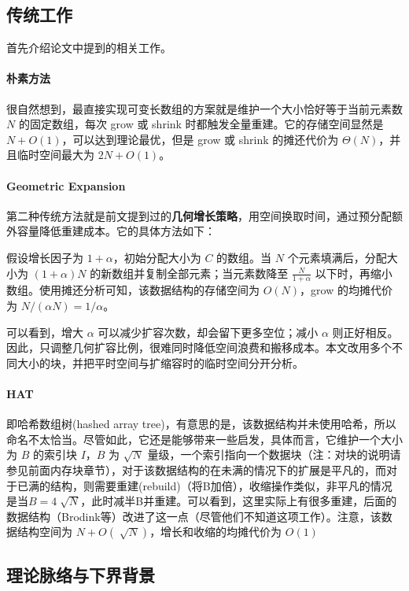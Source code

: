 \documentclass[12pt,a4paper]{article}
\begin{document}
\subsection{传统工作}

首先介绍论文中提到的相关工作。

\paragraph{朴素方法}

很自然想到，最直接实现可变长数组的方案就是维护一个大小恰好等于当前元素数 $N$ 的固定数组，每次 grow 或 shrink 时都触发全量重建。它的存储空间显然是 $N+O(1)$，可以达到理论最优，但是 grow 或 shrink 的摊还代价为 $\Theta(N)$，并且临时空间最大为 $2N+O(1)$。

\paragraph{Geometric Expansion} 第二种传统方法就是前文提到过的\textbf{几何增长策略}，用空间换取时间，通过预分配额外容量降低重建成本。它的具体方法如下：

假设增长因子为 $1+\alpha$，初始分配大小为 $C$ 的数组。当 $N$ 个元素填满后，分配大小为 $(1+\alpha)N$ 的新数组并复制全部元素；当元素数降至 $\frac{N}{1+\alpha}$ 以下时，再缩小数组。使用摊还分析可知，该数据结构的存储空间为 $O(N)$，grow 的均摊代价为 $N/(\alpha N)=1/\alpha$。

可以看到，增大 $\alpha$ 可以减少扩容次数，却会留下更多空位；减小 $\alpha$ 则正好相反。因此，只调整几何扩容比例，很难同时降低空间浪费和搬移成本。本文改用多个不同大小的块，并把平时空间与扩缩容时的临时空间分开分析。

\paragraph{HAT} 即哈希数组树(hashed array tree)\cite{sitarski1996hats}，有意思的是，该数据结构并未使用哈希，所以命名不太恰当。尽管如此，它还是能够带来一些启发，具体而言，它维护一个大小为 $B$ 的索引块 $I$，$B$ 为 $\sqrt{N}$ 量级，一个索引指向一个数据块（注：对块的说明请参见前面内存块章节），对于该数据结构的在未满的情况下的扩展是平凡的，而对于已满的结构，则需要重建(rebuild)（将B加倍），收缩操作类似，非平凡的情况是当$B=4\sqrt[]{N}$，此时减半B并重建。可以看到，这里实际上有很多重建，后面的数据结构（Brodink等）改进了这一点（尽管他们不知道这项工作）。注意，该数据结构空间为 $N+O(\sqrt[]{N})$，增长和收缩的均摊代价为 $O(1)$

\subsection{理论脉络与下界背景}
\end{document}
